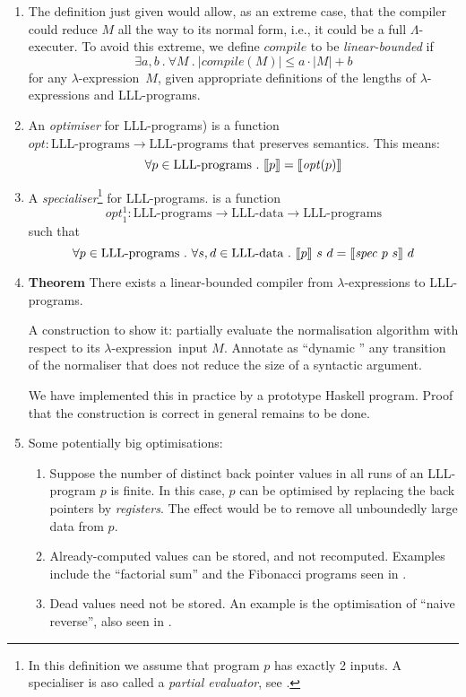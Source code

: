 \documentclass{llncs}
\newcommand{\lsem}{\mbox{$\lbrack\hspace{-0.3ex}\lbrack$}}
\newcommand{\rsem}{\mbox{$\rbrack\hspace{-0.3ex}\rbrack$}}
\newcommand{\vair}{\vspace{3mm}}
\newcommand{\lexp}{$\lambda$-expression}
\begin{document}
\begin{enumerate}
\item The definition just given would allow, as an extreme case, that the compiler could reduce $M$ all the way to its normal form, i.e., it could be a full $\Lambda$-executer. To avoid this extreme, we define $\mathit{compile}$ to be {\em linear-bounded} if 
$$
\exists a, b\ .\ \forall M \ .\ |\mathit{compile}(M)| \leq a \cdot |M| + b
$$
for any \lexp\ $M$, given appropriate definitions of the 
lengths of {\lexp}s and LLL-programs.
\vair 



\item An {\em optimiser} for LLL-programs) is a function $\mathit{opt} :  \mbox{LLL-programs} \to   \mbox{LLL-programs}$ that preserves semantics. This means: 
$$\forall p \in \mbox{LLL-programs} \ .\ \lsem p\rsem = \lsem \mathit{opt} (p) \rsem
$$


\vair 


\item  A 
{\em specialiser}\footnote{
In this definition we assume that program $p$  has exactly 2 inputs.
A specialiser is aso called a {\em partial evaluator}, see \cite{JGS93}. }
 for LLL-programs.  is a function 
$$
\mathit{opt}^1_1 :  \mbox{LLL-programs} \to    \mbox{LLL-data} \to   \mbox{LLL-programs}
$$
such that
$$\forall p \in \mbox{LLL-programs} \ .\ 
\forall s, d \in \mbox{LLL-data} \ .\ 
\lsem p\rsem \ s\  d = \lsem \mathit{spec}\ p\ s \rsem\  d
$$


\vair 

\item {\bf Theorem} There exists a linear-bounded compiler from {\lexp}s to LLL-programs.

A construction to show it: partially evaluate the  normalisation algorithm   with respect to its  \lexp\ input $M$. Annotate as ``dynamic '' any transition of the normaliser that does not reduce the size of a syntactic argument.


We have implemented this in practice by a prototype Haskell program. Proof that the construction is correct in general remains to be done.
\vair 


\item Some potentially big optimisations:
\vair

\begin{enumerate}
\item Suppose the number of distinct back pointer values in all runs of an LLL-program $p$ is finite. 
In this case, $p$ can be optimised by replacing the back pointers by {\em registers}. The effect would be to remove all unboundedly large data from  $p$.
\vair

\item Already-computed values can be stored, and not recomputed. Examples  include the ``factorial sum'' and the Fibonacci programs seen in  \cite{META14}.
\vair

\item Dead values need not be stored. An example is   the optimisation of ``naive reverse'', also seen in  \cite{META14}.
\end{enumerate}
\vair 

\end{enumerate} 





\nocite{*}
\end{document}
